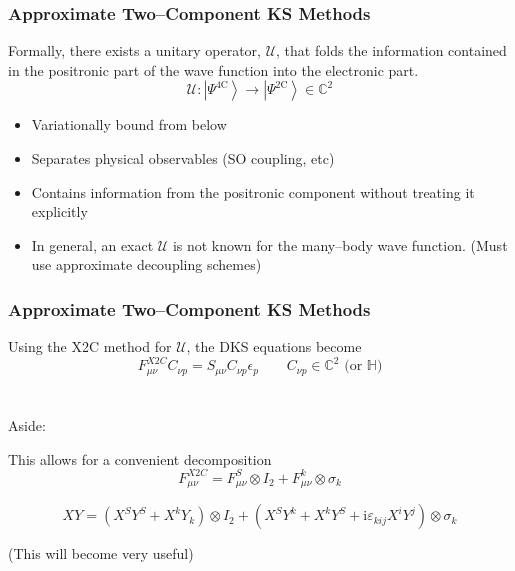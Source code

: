 \documentclass{beamer}
\newcommand{\bpar}[1]{\left( #1 \right)}                  %
\newcommand{\ket}[1]{\left \vert #1 \right \rangle}
\begin{document}
\begin{frame}
\frametitle{Approximate Two--Component KS Methods}

Formally, there exists a unitary operator, $\mathcal{U}$, that folds the information
contained in the positronic part of the wave function into the electronic part.
\begin{equation*}
\mathcal{U} : \ket{\Psi^\mathrm{4C}} \rightarrow \ket{\Psi^\mathrm{2C}} \in \mathbb{C}^2
\end{equation*}

\begin{itemize}
  \color{green}
  \item Variationally bound from below
  \item Separates physical observables (SO coupling, etc)
  \item Contains information from the positronic component without treating it explicitly
\end{itemize}

\begin{itemize}
  \color{red}
  \item In general, an exact $\mathcal{U}$ is not known for the many--body wave function.
  (Must use approximate decoupling schemes)
\end{itemize}

\end{frame}


\begin{frame}
\frametitle{Approximate Two--Component KS Methods}

Using the X2C method for $\mathcal{U}$, the DKS equations become
\begin{equation*}
F^{X2C}_{\mu\nu} C_{\nu p} = S_{\mu\nu} C_{\nu p} \epsilon_p \qquad C_{\nu p} \in \mathbb{C}^2 \text{ (or }\mathbb{H})
\end{equation*}
~\\
~\\
Aside: 

This allows for a convenient decomposition
\begin{equation*}
F_{\mu\nu}^{X2C} = F_{\mu\nu}^S \otimes I_2 + F_{\mu\nu}^k \otimes \sigma_k
\end{equation*}


\begin{equation*}
XY = \bpar{X^SY^S + X^kY_k} \otimes I_2 + \bpar{X^S Y^k + X^k Y^S + \mathrm{i}\varepsilon_{kij}X^iY^j}\otimes \sigma_k
\end{equation*}
\begin{center} (This will become very useful) \end{center}
\end{frame}
\end{document}
